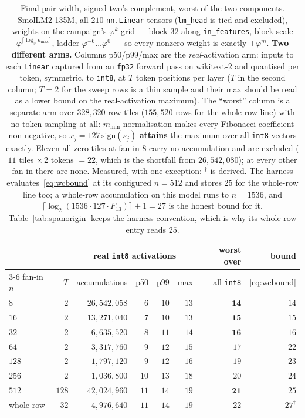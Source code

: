 \documentclass[11pt]{article}
\theoremstyle{definition}
\begin{document}
\begin{table}[t]\centering
\caption{Final-pair width, signed two's complement, worst of the two components.
SmolLM2-135M, all $210$ \texttt{nn.Linear} tensors (\texttt{lm\_head} is tied and
excluded), weights on the campaign's $\varphi^{k}$ grid --- block $32$ along
\texttt{in\_features}, block scale $\varphi^{\lceil\log_\varphi a_{\max}\rceil}$,
ladder $\varphi^{-6}\dots\varphi^{0}$ --- so every nonzero weight is exactly
$\pm\varphi^{m}$. \textbf{Two different arms.} Columns p50/p99/max are the
\emph{real}-activation arm: inputs to each \texttt{Linear} captured from an
\texttt{fp32} forward pass on wikitext-2 and quantised per token, symmetric, to
\texttt{int8}, at $T$ token positions per layer ($T$ in the second column;
$T\!=\!2$ for the sweep rows is a thin sample and their max should be read as a
lower bound on the real-activation maximum). The ``worst'' column is a separate
arm over $328{,}320$ row-tiles ($155{,}520$ rows for the whole-row line) with no
token sampling at all: $m_{\min}$ normalisation makes every Fibonacci coefficient
non-negative, so $x_j = 127\,\mathrm{sign}(s_j)$ \textbf{attains} the maximum over
all \texttt{int8} vectors exactly. Eleven all-zero tiles at fan-in $8$ carry no
accumulation and are excluded ($11$ tiles $\times\,2$ tokens $=22$, which is the
shortfall from $26{,}542{,}080$); at every other fan-in there are none. Measured,
with one exception: $^{\dagger}$ is derived. The harness
evaluates~\eqref{eq:wcbound} at its configured $n=512$ and stores $25$ for the
whole-row line too; a whole-row accumulation on this model runs to $n=1536$, and
$\lceil\log_2(1536\cdot127\cdot F_{13})\rceil+1 = 27$ is the honest bound for it.
Table~\ref{tab:spanorigin} keeps the harness convention, which is why its
whole-row entry reads $25$.}
\label{tab:accwidth}
\begin{tabular}{lrrrrrrr}
\toprule
& & \multicolumn{4}{c}{real \texttt{int8} activations} & worst over & bound \\
\cmidrule(lr){3-6}
fan-in $n$ & $T$ & accumulations & p50 & p99 & max & all \texttt{int8} & \eqref{eq:wcbound} \\
\midrule
$8$        & $2$   & $26{,}542{,}058$ & $6$  & $10$ & $13$ & $\mathbf{14}$ & $14$ \\
$16$       & $2$   & $13{,}271{,}040$ & $7$  & $10$ & $13$ & $\mathbf{15}$ & $15$ \\
$32$       & $2$   & $6{,}635{,}520$  & $8$  & $11$ & $14$ & $\mathbf{16}$ & $16$ \\
$64$       & $2$   & $3{,}317{,}760$  & $9$  & $12$ & $15$ & $17$ & $22$ \\
$128$      & $2$   & $1{,}797{,}120$  & $9$  & $12$ & $16$ & $19$ & $23$ \\
$256$      & $2$   & $1{,}036{,}800$  & $10$ & $13$ & $18$ & $20$ & $24$ \\
$512$      & $128$ & $42{,}024{,}960$ & $11$ & $14$ & $19$ & $\mathbf{21}$ & $25$ \\
whole row  & $32$  & $4{,}976{,}640$  & $11$ & $14$ & $19$ & $22$ & $27^{\dagger}$ \\
\bottomrule
\end{tabular}
\end{table}
\end{document}
